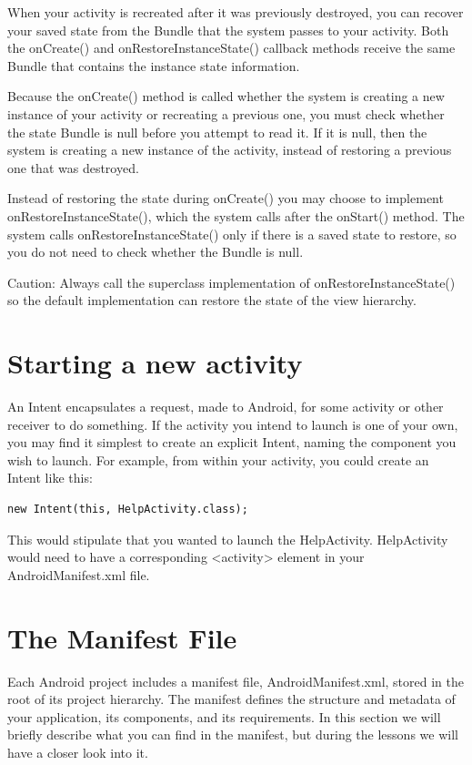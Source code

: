 When your activity is recreated after it was previously destroyed, you can recover your saved state from the Bundle that the system passes to your activity. Both the onCreate() and onRestoreInstanceState() callback methods receive the same Bundle that contains the instance state information.

Because the onCreate() method is called whether the system is creating a new instance of your activity or recreating a previous one, you must check whether the state Bundle is null before you attempt to read it. If it is null, then the system is creating a new instance of the activity, instead of restoring a previous one that was destroyed.

Instead of restoring the state during onCreate() you may choose to implement onRestoreInstanceState(), which the system calls after the onStart() method. The system calls onRestoreInstanceState() only if there is a saved state to restore, so you do not need to check whether the Bundle is null.

Caution: Always call the superclass implementation of onRestoreInstanceState() so the default implementation can restore the state of the view hierarchy.

\section{Starting a new activity}
An Intent encapsulates a request, made to Android, for some activity or other
receiver to do something. If the activity you intend to launch is one of your own, you may find it simplest to
create an explicit Intent, naming the component you wish to launch. For example,
from within your activity, you could create an Intent like this:

\begin{lstlisting}
new Intent(this, HelpActivity.class);
\end{lstlisting}


This would stipulate that you wanted to launch the HelpActivity. HelpActivity
would need to have a corresponding <activity> element in your
AndroidManifest.xml file.

\section{The Manifest File}
Each Android project includes a manifest file, AndroidManifest.xml, stored in the root of its project hierarchy. The manifest defines the structure and metadata of your application, its components, and its requirements. In this section we will briefly describe what you can find in the manifest, but during the lessons we will have a closer look into it.

